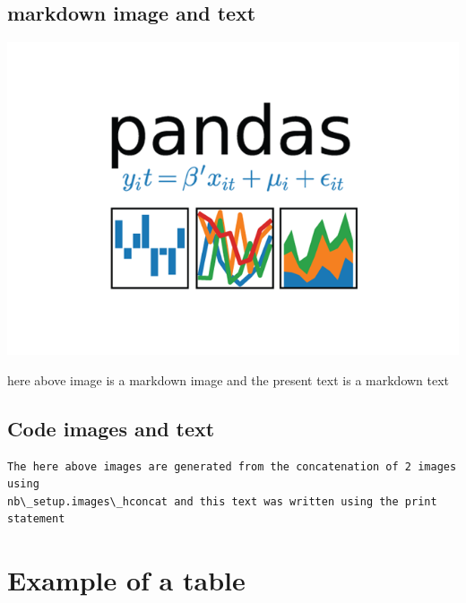 \documentclass[reprint, floatfix, groupaddress, prb]{article}
\newcommand{\prompt}[4]{
        \ttfamily\llap{{\color{#2}[#3]:\hspace{3pt}#4}}\vspace{-\baselineskip}
    }
\begin{document}
    \hypertarget{markdown-image-and-text}{%
\subsection{markdown image and text}\label{markdown-image-and-text}}

    \includegraphics{pics/pandas_logo.png}

    here above image is a markdown image and the present text is a markdown
text

    \hypertarget{code-images-and-text}{%
\subsection{Code images and text}\label{code-images-and-text}}
 
            
\prompt{Out}{outcolor}{5}{}
    
    \begin{figure}
        \begin{center}\end{center}
        \caption{}
        \label{}
    \end{figure}
    

    \begin{Verbatim}[commandchars=\\\{\}]
 The here above images are generated from the concatenation of 2 images using
nb\_setup.images\_hconcat and this text was written using the print statement
    \end{Verbatim}

    \hypertarget{example-of-a-table}{%
\section{Example of a table}\label{example-of-a-table}}
\end{document}
